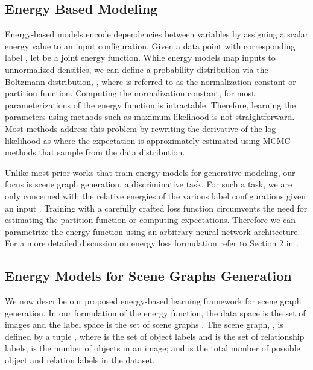 \documentclass[final]{cvpr}
\begin{document}
\subsection{Energy Based Modeling}
Energy-based models \cite{lecun2006tutorial} encode dependencies between variables by assigning a scalar energy value to an input configuration. Given a data point  with corresponding label , let  be a joint energy function. While energy models map inputs to unnormalized densities, we can define a probability distribution via the Boltzmann distribution, , where  is referred to as the normalization constant or partition function. Computing the normalization constant,  for most parameterizations of the energy function is intractable. Therefore, learning the parameters  using methods such as maximum likelihood is not straightforward. Most methods address this problem by rewriting the derivative of the log likelihood as 
where the expectation is approximately estimated using MCMC methods that sample from the data distribution. 

Unlike most prior works that train energy models for generative modeling, our focus is scene graph generation, a discriminative task. For such a task, we are only concerned with the relative energies of the various label configurations given an input . Training with a carefully crafted loss function circumvents the need for estimating the partition function or computing expectations. Therefore we can parametrize the energy function using an arbitrary neural network architecture. For a more detailed discussion on energy loss formulation refer to Section 2 in \cite{lecun2005loss}. 


\subsection{Energy Models for Scene Graphs Generation}
We now describe our proposed energy-based learning framework for scene graph generation. In our formulation of the energy function, the data space  is the set of images  and the label space  is the set of scene graphs . 
The scene graph, , is defined by a tuple  , where  is the set of object labels and  is the set of relationship labels;  is the number of objects in an image;  and  is the total number of possible object and relation labels in the dataset. 
\end{document}
